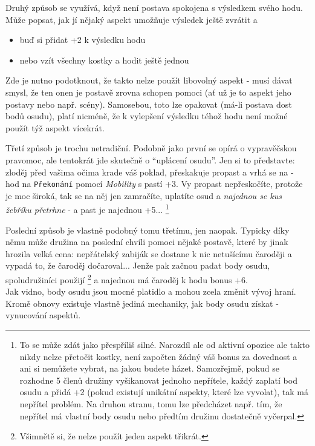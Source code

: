 Druhý způsob se využívá, když není postava spokojena s výsledkem svého hodu. Může popsat, jak jí nějaký aspekt umožňuje výsledek ještě zvrátit a

\begin{itemize}
\item buď si přidat +2 k výsledku hodu
\item nebo vzít všechny kostky a hodit ještě jednou
\end{itemize}

Zde je nutno podotknout, že takto nelze použít libovolný aspekt - musí dávat smysl, že ten onen je postavě zrovna schopen pomoci (ať už je to aspekt jeho postavy nebo např. scény). Samosebou, toto lze opakovat (má-li postava dost bodů osudu), platí nicméně, že k vylepšení výsledku téhož hodu není možné použít týž aspekt vícekrát.

Třetí způsob je trochu netradiční. Podobně jako první se opírá o vypravěčskou pravomoc, ale tentokrát jde skutečně o ``uplácení osudu''. Jen si to představte: zloděj před vašima očima krade váš poklad, přeskakuje propast a vrhá se na  - hod na \texttt{Překonání} pomocí \textit{Mobility} s pastí +3. Vy propast nepřeskočíte, protože je moc široká, tak se na něj jen zamračíte, uplatíte osud a \textit{najednou se kus žebříku přetrhne} - a past je najednou +5... \footnote{To se může zdát jako přespříliš silné. Narozdíl ale od aktivní opozice ale takto nikdy nelze přetočit kostky, není započten žádný váš bonus za dovednost a ani si nemůžete vybrat, na jakou budete házet. Samozřejmě, pokud se rozhodne 5 členů družiny vyšikanovat jednoho nepřítele, každý zaplatí bod osudu a přidá +2 (pokud existují unikátní aspekty, které lze vyvolat), tak má nepřítel problém. Na druhou stranu, tomu lze předcházet např. tím, že nepřítel má vlastní body osudu nebo předtím družinu dostatečně vyčerpal.}

Poslední způsob je vlastně podobný tomu třetímu, jen naopak. Typicky díky němu může družina na poslední chvíli pomoci nějaké postavě, které by jinak hrozila velká cena: nepřátelský zabiják se dostane k nic netušícímu čaroději a vypadá to, že čaroděj dočaroval... Jenže pak začnou padat body osudu, spoludružiníci použijí  \footnote{Všimnětě si, že nelze použít jeden aspekt třikrát.} a najednou má čaroděj k hodu bonus +6. \\

Jak vidno, body osudu jsou mocné platidlo a mohou zcela změnit vývoj hraní. Kromě obnovy existuje vlastně jediná mechaniky, jak body osudu získat - vynucování aspektů.

